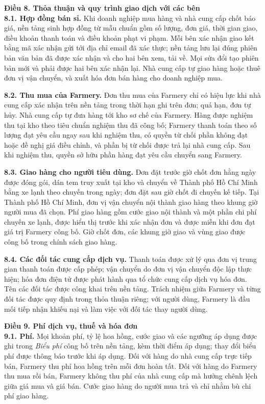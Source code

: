 \noindent\textbf{Điều 8. Thỏa thuận và quy trình giao dịch với các bên}\\
\textbf{8.1. Hợp đồng bán sỉ.} Khi doanh nghiệp mua hàng và nhà cung cấp chốt
báo giá, nền tảng sinh hợp đồng từ mẫu chuẩn gồm số lượng, đơn giá, thời gian
giao, điều khoản thanh toán và điều khoản phạt vi phạm. Mỗi bên xác nhận giao
kết bằng mã xác nhận gửi tới địa chỉ email đã xác thực; nền tảng lưu lại đúng
phiên bản văn bản đã được xác nhận và cho hai bên xem, tải về. Mọi sửa đổi tạo
phiên bản mới và phải được hai bên xác nhận lại. Nhà cung cấp tự giao hàng
hoặc thuê đơn vị vận chuyển, và xuất hóa đơn bán hàng cho doanh nghiệp mua.

\textbf{8.2. Thu mua của Farmery.} Đơn thu mua của Farmery chỉ có hiệu lực khi
nhà cung cấp xác nhận trên nền tảng trong thời hạn ghi trên đơn; quá hạn, đơn
tự hủy. Nhà cung cấp tự đưa hàng tới kho sơ chế của Farmery. Hàng được nghiệm
thu tại kho theo tiêu chuẩn nghiệm thu đã công bố; Farmery thanh toán theo số
lượng đạt yêu cầu ngay sau khi nghiệm thu, có quyền từ chối phần không đạt
hoặc đề nghị giá điều chỉnh, và phần bị từ chối được trả lại nhà cung cấp. Sau
khi nghiệm thu, quyền sở hữu phần hàng đạt yêu cầu chuyển sang Farmery.

\textbf{8.3. Giao hàng cho người tiêu dùng.} Đơn đặt trước giờ chốt đơn hằng
ngày được đóng gói, dán tem truy xuất tại kho và chuyển về Thành phố Hồ Chí
Minh bằng xe lạnh theo chuyến trong ngày; đơn đặt sau giờ chốt đi chuyến kế
tiếp. Tại Thành phố Hồ Chí Minh, đơn vị vận chuyển nội thành giao hàng theo
khung giờ người mua đã chọn. Phí giao hàng gồm cước giao nội thành và một
phần chi phí chuyến xe lạnh, được hiển thị trước khi xác nhận đơn và được miễn
khi đơn đạt giá trị Farmery công bố. Giờ chốt đơn, các khung giờ giao và vùng
giao được công bố trong chính sách giao hàng.

\textbf{8.4. Các đối tác cung cấp dịch vụ.} Thanh toán được xử lý qua đơn vị
trung gian thanh toán được cấp phép; vận chuyển do đơn vị vận chuyển độc lập
thực hiện; hóa đơn điện tử được phát hành qua tổ chức cung cấp dịch vụ hóa
đơn. Tên các đối tác được công khai trên nền tảng. Trách nhiệm giữa Farmery và
từng đối tác được quy định trong thỏa thuận riêng; với người dùng, Farmery là
đầu mối tiếp nhận khiếu nại và làm việc với đối tác thay người dùng.

\noindent\textbf{Điều 9. Phí dịch vụ, thuế và hóa đơn}\\
\textbf{9.1. Phí.} Mọi khoản phí, tỷ lệ hoa hồng, cước giao và các ngưỡng áp
dụng được ghi trong \emph{Biểu phí} công bố trên nền tảng, kèm thời điểm áp
dụng; thay đổi biểu phí được thông báo trước khi áp dụng. Đối với hàng do
nhà cung cấp trực tiếp bán, Farmery thu phí hoa hồng trên mỗi đơn hoàn tất.
Đối với hàng do Farmery thu mua rồi bán, Farmery không thu phí của nhà cung
cấp mà hưởng chênh lệch giữa giá mua và giá bán. Cước giao hàng do người mua
trả và chỉ nhằm bù chi phí giao hàng.

